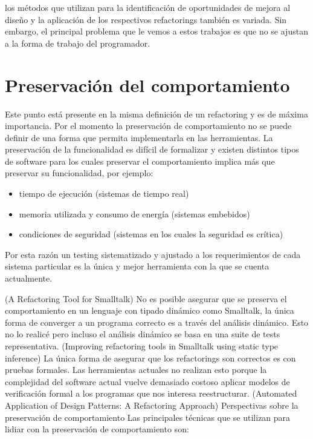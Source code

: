 los métodos que utilizan para la identificación de oportunidades de mejora al diseño y la aplicación
de los respectivos refactorings también es variada. Sin embargo, el principal problema que
le vemos a estos trabajos es que no se ajustan a la forma de trabajo del programador.

\section{Preservación del comportamiento}
Este punto está presente en la misma definición de un refactoring y es de máxima importancia. Por el
momento la preservación de comportamiento no se puede definir de una forma que permita implementarla
en las herramientas. La preservación de la funcionalidad es difícil de formalizar y existen
distintos tipos de software para los cuales preservar el comportamiento implica más que preservar su
funcionalidad, por ejemplo:

\begin{itemize}
    \item tiempo de ejecución (sistemas de tiempo real)
    \item memoria utilizada y consumo de energía (sistemas embebidos) 
    \item condiciones de seguridad (sistemas en los cuales la seguridad es crítica)
\end{itemize}

Por esta razón un testing sistematizado y ajustado a los requerimientos de cada sistema particular
es la única y mejor herramienta con la que se cuenta actualmente.

(A Refactoring Tool for Smalltalk) No es posible asegurar que se preserva el comportamiento en un
lenguaje con tipado dinámico como Smalltalk, la única forma de converger a un programa correcto es a
través del análisis dinámico. Esto no lo realicé pero incluso el análisis dinámico se basa en una
suite de tests representativa.
(Improving refactoring tools in Smalltalk using static type inference) La única forma de asegurar
que los refactorings son correctos es con pruebas formales. Las herramientas actuales no realizan
esto porque la complejidad del software actual vuelve demasiado costoso aplicar modelos de
verificación formal a los programas que nos interesa reestructurar.
(Automated Application of Design Patterns: A Refactoring Approach) Perspectivas sobre la
preservación de comportamiento Las principales técnicas que se utilizan para lidiar con la
preservación de comportamiento son:

